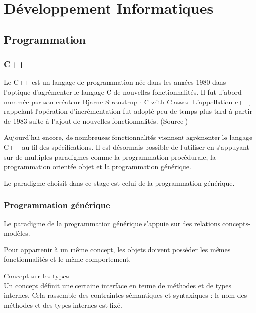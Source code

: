 \section{Développement Informatiques}

\subsection{Programmation}

\subsubsection{C++}


Le C++ est un langage de programmation née dans les années 1980 dans l'optique d'agrémenter le langage C de nouvelles fonctionnalités. Il fut d'abord nommée par son créateur Bjarne Stroustrup : C with Classes. L’appellation c++, rappelant l'opération d'incrémentation fut adopté peu de temps plus tard à partir de 1983 suite à l'ajout de nouvelles fonctionnalités. (Source \cite{Wiki-cpp})

Aujourd'hui encore, de nombreuses fonctionnalités viennent agrémenter le langage C++ au fil des spécifications. Il est désormais possible de l'utiliser en s'appuyant sur de multiples paradigmes comme la programmation procédurale, la programmation orientée objet et la programmation générique.

Le paradigme choisit dans ce stage est celui de la programmation générique. \cite{troussil-cpp}

\subsubsection{Programmation générique}


Le paradigme de la programmation générique s'appuie sur des relations concepts-modèles. 

Pour appartenir à un même concept, les objets doivent posséder les mêmes fonctionnalités et le même comportement. 

\begin{Definition}{Concept sur les types}\\
\label{def:cpp-con}
    Un concept définit une certaine interface en terme de méthodes et de types internes. Cela rassemble des contraintes sémantiques et syntaxiques : le nom des méthodes et des types internes est fixé.
\end{Definition}

